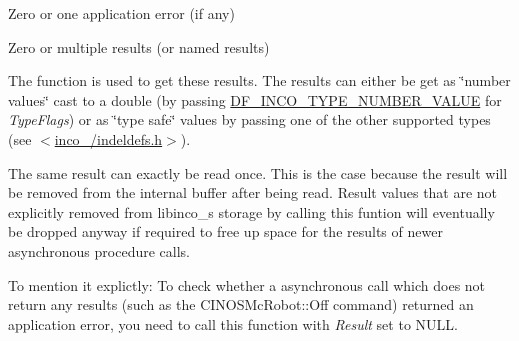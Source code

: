 \begin{DoxyItemize}
\item Zero or one application error (if any)
\item Zero or multiple results (or named results)
\end{DoxyItemize}

The function is used to get these results. The results can either be get as \char`\"{}number values\char`\"{} cast to a double (by passing \hyperlink{indeldefs_8h_a0f27c7a63f462a5f51c285c85d7a5cac}{D\+F\+\_\+\+I\+N\+C\+O\+\_\+\+T\+Y\+P\+E\+\_\+\+N\+U\+M\+B\+E\+R\+\_\+\+V\+A\+L\+UE} for {\itshape Type\+Flags}) or as \char`\"{}type safe\char`\"{} values by passing one of the other supported types (see $<$\hyperlink{indeldefs_8h}{inco\+\_/indeldefs.\+h}$>$).

The same result can exactly be read once. This is the case because the result will be removed from the internal buffer after being read. Result values that are not explicitly removed from libinco\+\_\textquotesingle{}s storage by calling this funtion will eventually be dropped anyway if required to free up space for the results of newer asynchronous procedure calls.

To mention it explictly\+: To check whether a asynchronous call which does not return any results (such as the C\+I\+N\+O\+S\+Mc\+Robot\+::\+Off command) returned an application error, you need to call this function with {\itshape Result} set to N\+U\+LL.


